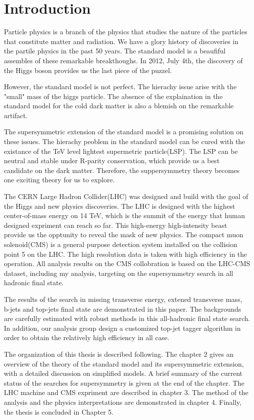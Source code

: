 \chapter{Introduction}

Particle physics is a branch of the physics that studies the nature of the particles that constitute matter and radiation. We have a glory history of discoveries in the partile physics in the past 50 years. The standard model is a beaufiful assembles of these remarkable breakthoughs. In 2012, July 4th, the discovery of the Higgs boson provides us the last piece of the puzzel.

However, the standard model is not perfect. The hierachy issue arise with the "small" mass of the higgs particle. The absence of the explaination in the standard model for the cold dark matter is also a blemish on the remarkable artifact.

The supersymmetric extension of the standard model is a promising solution on these issues. The hierachy peoblem in the standard model can be cured with the existance of the TeV level lightest supermetric particle(LSP). The LSP can be neutral and stable under R-parity conservation, which provide us a best candidate on the dark matter. Therefore, the suppersymmetry theory becomes one exciting theory for us to explore.  

The CERN Large Hadron Collider(LHC) was designed and build with the goal of the Higgs and new physics discoveries. The LHC is designed with the highest center-of-mass energy on 14 TeV, which is the summit of the energy that human designed expriment can reach so far. This high-energy high-intensity beast provide us the opptunity to reveal the mask of new physics. The compact muon solenoid(CMS) is a general purpose detection system installed on the collision point 5 on the LHC. The high resolution data is taken with high efficiency in the operation. All analysis results on the CMS collobration is based on the LHC-CMS dataset, including my analysis, targeting on the supersymmetry search in all hadronic final state.

The results of the search in missing transverse energy, extened transverse mass, b-jets and top-jets final state are demonstrated in this paper. The backgrounds are carefully estimated with robust methods in this all-hadronic final state search. In addition, our analysis group design a customized top-jet tagger algorithm in order to obtain the relatively high efficiency in all case.

The organization of this thesis is described following. The chapter 2 gives an overview of the theory of the standard model and its supersymmetric extension, with a detailed discussion on simplified models. A brief summary of the current status of the searches for supersymmetry is given at the end of the chapter. The LHC machine and CMS expriment are described in chapter 3. The method of the analysis and the physics interpretations are demonstrated in chapter 4. Finally, the thesis is concluded in Chapter 5.
